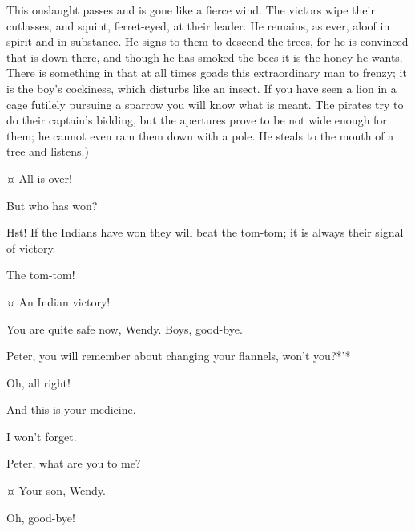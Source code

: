 \begin{drama}
\begin{stagedir}
This onslaught passes and is gone like a fierce wind.
The victors wipe their cutlasses, and squint, ferret-eyed, at their leader.
He remains, as ever, aloof in spirit and in substance.
He signs to them to descend the trees, for he is convinced that \pan is down there,
and though he has smoked the bees it is the honey he wants.
There is something in \peter that at all times goads this extraordinary man to frenzy;
it is the boy’s cockiness, which disturbs \hook like an insect.
If you have seen a lion in a cage futilely pursuing a sparrow you will know what is meant.
The pirates try to do their captain’s bidding, but the apertures prove to be not wide enough for them;
he cannot even ram them down with a pole.
He steals to the mouth of a tree and listens.)
\end{stagedir}

\peterspeaks {}¤
All is over!

\wendyspeaks
But who has won?

\peterspeaks
Hst!
If the Indians have won they will beat the tom-tom; it is always their signal of victory.


\tootlesspeaks
The tom-tom!

\peterspeaks {}¤
An Indian victory!


\speakercontinues
You are quite safe now, Wendy.
Boys, good-bye.

\wendyspeaks
Peter, you will remember about changing your flannels, won’t you?*'*

\peterspeaks
Oh, all right!

\wendyspeaks
And this is your medicine.


\peterspeaks
I won’t forget.

\wendyspeaks
Peter, what are you to me?

\peterspeaks {}¤
Your son, Wendy.

\wendyspeaks
Oh, good-bye!

\end{drama}
